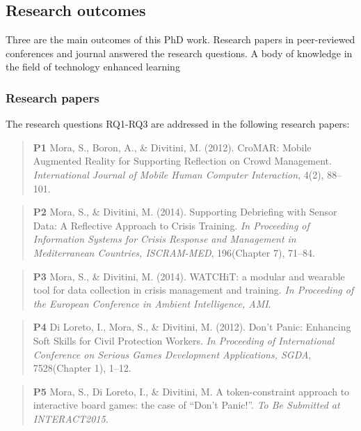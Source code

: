 \subsection{Research outcomes}\label{research-outcomes}

Three are the main outcomes of this PhD work. Research papers in
peer-reviewed conferences and journal answered the research questions. A
body of knowledge in the field of technology enhanced learning

\subsubsection{Research papers}\label{research-papers}

The research questions RQ1-RQ3 are addressed in the following research
papers:

\begin{quote}
\textbf{P1} Mora, S., Boron, A., \& Divitini, M. (2012). CroMAR: Mobile
Augmented Reality for Supporting Reflection on Crowd Management.
\emph{International Journal of Mobile Human Computer Interaction}, 4(2),
88--101.
\end{quote}

\begin{quote}
\textbf{P2} Mora, S., \& Divitini, M. (2014). Supporting Debriefing with
Sensor Data: A Reflective Approach to Crisis Training. \emph{In
Proceeding of Information Systems for Crisis Response and Management in
Mediterranean Countries, ISCRAM-MED}, 196(Chapter 7), 71--84.
\end{quote}

\begin{quote}
\textbf{P3} Mora, S., \& Divitini, M. (2014). WATCHiT: a modular and
wearable tool for data collection in crisis management and training.
\emph{In Proceeding of the European Conference in Ambient Intelligence,
AMI}.
\end{quote}

\begin{quote}
\textbf{P4} Di Loreto, I., Mora, S., \& Divitini, M. (2012). Don't
Panic: Enhancing Soft Skills for Civil Protection Workers. \emph{In
Proceeding of International Conference on Serious Games Development
Applications, SGDA}, 7528(Chapter 1), 1--12.
\end{quote}

\begin{quote}
\textbf{P5} Mora, S., Di Loreto, I., \& Divitini, M. A token-constraint
approach to interactive board games: the case of ``Don't Panic!''.
\emph{To Be Submitted at INTERACT2015}.
\end{quote}

